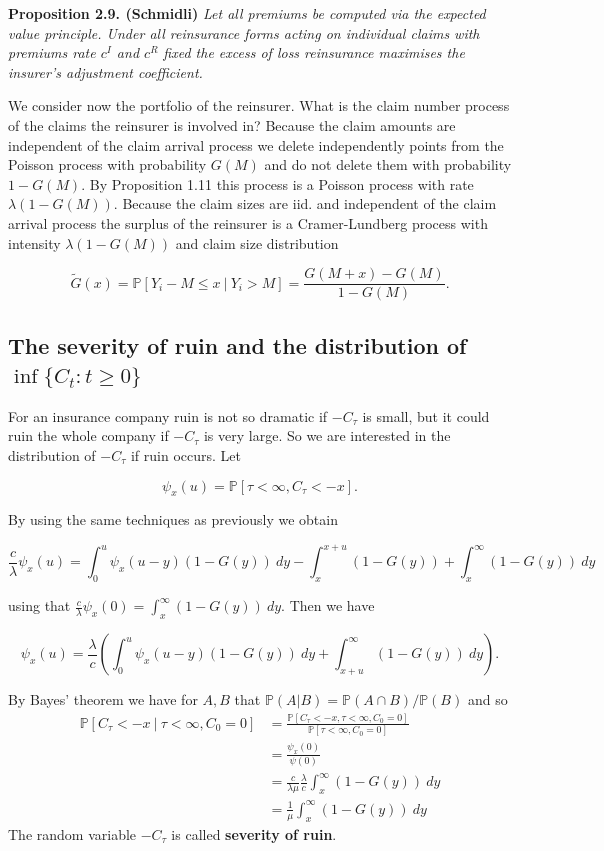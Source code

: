 \documentclass[a4paper,12pt,openany]{book}
\begin{document}
\textbf{Proposition 2.9. (Schmidli) } \emph{Let all premiums be computed via the expected value principle. Under all reinsurance forms acting on individual claims with premiums rate \(c^I\) and \(c^R\) fixed the excess of loss reinsurance maximises the insurer's adjustment coefficient.}

We consider now the portfolio of the reinsurer. What is the claim number process of the claims the reinsurer is involved in? Because the claim amounts are independent of the claim arrival process we delete independently points from the Poisson process with probability \(G(M)\) and do not delete them with probability \(1 − G(M)\). By Proposition 1.11 this process is a Poisson process with rate \(\lambda (1 − G(M))\). Because the claim sizes are iid. and independent of the claim arrival process the surplus of the reinsurer is a Cramer-Lundberg process with intensity \(\lambda (1 − G(M))\) and claim size distribution

\[
\tilde G(x)=\mathbb P[Y_i-M\le x\ \vert\ Y_i> M]=\frac{G(M+x)-G(M)}{1-G(M)}.
\]

\hypertarget{the-severity-of-ruin-and-the-distribution-of-infc_t-t-ge-0}{%
\subsection{\texorpdfstring{The severity of ruin and the distribution of \(\inf\{C_t : t \ge 0\}\)}{The severity of ruin and the distribution of \textbackslash inf\textbackslash\{C\_t : t \textbackslash ge 0\textbackslash\}}}\label{the-severity-of-ruin-and-the-distribution-of-infc_t-t-ge-0}}

For an insurance company ruin is not so dramatic if \(−C_\tau\) is small, but it could ruin the whole company if \(−C_\tau\) is very large. So we are interested in the distribution of \(−C_\tau\) if ruin occurs. Let

\[
\psi_x(u)=\mathbb P[\tau <\infty, C_\tau <-x].
\]

By using the same techniques as previously we obtain

\[
\frac{c}{\lambda}\psi_x(u)=\int_0^u\psi_x(u-y)(1-G(y))\ dy-\int_x^{x+u}(1-G(y))+\int_x^\infty(1-G(y))\ dy
\]

using that \(\frac{c}{\lambda}\psi_x(0)=\int_x^\infty(1-G(y))\ dy\). Then we have

\[
\psi_x(u)=\frac{\lambda}{c}\left(\int_0^u\psi_x(u-y)(1-G(y))\ dy+\int_{x+u}^\infty(1-G(y))\ dy\right).
\]

By Bayes' theorem we have for \(A,B\) that \(\mathbb P(A\vert B)=\mathbb P(A\cap B)/\mathbb P(B)\) and so
\begin{align*}
\mathbb P[C_\tau <-x\ \vert\ \tau<\infty,C_0=0]&=\frac{\mathbb P[C_\tau <-x, \tau<\infty,C_0=0]}{\mathbb P[
\tau<\infty,C_0=0]}\\
&=\frac{\psi_x(0)}{\psi(0)}\\
&=\frac{c}{\lambda \mu}\frac{\lambda}{c}\int_{x}^\infty(1-G(y))\ dy\\
&=\frac{1}{\mu}\int_{x}^\infty(1-G(y))\ dy
\end{align*}
The random variable \(−C_\tau\) is called \textbf{severity of ruin}.
\end{document}
